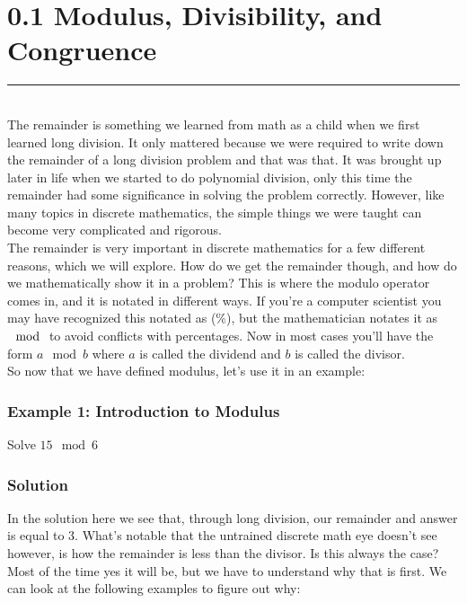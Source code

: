 \documentclass[12pt]{article}
\begin{document}
\section*{0.1 Modulus, Divisibility, and Congruence}
\rule{500pt}{1pt} \\
\indent \indent The remainder is something we learned from math as a child when we first learned long division. It only mattered because we were required to write down the remainder of a long division problem and that was that. It was brought up later in life when we started to do polynomial division, only this time the remainder had some significance in solving the problem correctly. However, like many topics in discrete mathematics, the simple things we were taught can become very complicated and rigorous. \\
\indent \indent The remainder is very important in discrete mathematics for a few different reasons, which we will explore. How do we get the remainder though, and how do we mathematically show it in a problem? This is where the modulo operator comes in, and it is notated in different ways. If you're a computer scientist you may have recognized this notated as (\%), but the mathematician notates it as $\mod$ to avoid conflicts with percentages. Now in most cases you'll have the form $a \mod{b}$ where $a$ is called the dividend and $b$ is called the divisor. \\
\indent \indent So now that we have defined modulus, let's use it in an example:
\subsubsection*{Example 1: Introduction to Modulus}
\begin{center}
    Solve $15 \mod{6}$
\end{center}
\subsubsection*{Solution}
\begin{center}
\end{center}

\indent \indent In the solution here we see that, through long division, our remainder and answer is equal to 3. What's notable that the untrained discrete math eye doesn't see however, is how the remainder is less than the divisor. Is this always the case? Most of the time yes it will be, but we have to understand why that is first. We can look at the following examples to figure out why:
\end{document}
